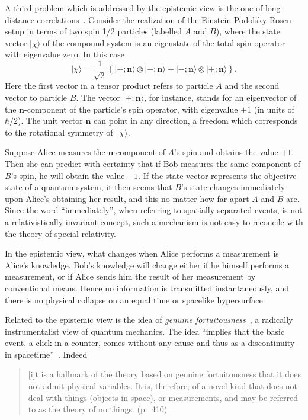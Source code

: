 \documentclass[12pt]{article}
\begin{document}
A third problem which is addressed by the epistemic view
is the one of long-distance correlations~\cite{fuchs2,bloch}.
Consider the realization of the Einstein-Podolsky-Rosen
setup in terms of two spin 1/2 particles (labelled $A$
and $B$), where the state vector $|\chi\rangle$
of the compound system is an eigenstate of the
total spin operator with eigenvalue zero.  In this case
%
\begin{equation}
|\chi\rangle = \frac{1}{\sqrt{2}}
\left\{ |+; \mathbf{n} \rangle \otimes |-; \mathbf{n} \rangle -
|-; \mathbf{n} \rangle \otimes |+; \mathbf{n} \rangle \right\} .
\end{equation}
%
Here the first vector in a tensor product refers to
particle $A$ and the second vector to particle $B$.
The vector $|+; \mathbf{n} \rangle $, for instance,
stands for an eigenvector of the $\mathbf{n}$-component
of the particle's spin operator, with eigenvalue
$+1$ (in units of $\hbar/2$).
The unit vector $\mathbf{n}$ can point in any direction,
a freedom which corresponds to the
rotational symmetry of~$|\chi\rangle$.

Suppose Alice measures the $\mathbf{n}$-component
of $A$'s spin and obtains the value $+1$.  Then
she can predict with certainty that if Bob measures
the same component of $B$'s spin, he will obtain the
value $-1$.  If the state vector represents the
objective state of a quantum system, it then seems that
$B$'s state changes immediately upon Alice's obtaining
her result, and this no matter how far apart $A$ and
$B$ are.  Since the word ``immediately'', when
referring to spatially separated events, is not a
relativistically invariant concept, such a mechanism is
not easy to reconcile with the theory of special relativity.

In the epistemic view, what changes when Alice
performs a measurement is Alice's knowledge.
Bob's knowledge will change either if he himself
performs a measurement, or if Alice sends him
the result of her measurement by conventional
means.  Hence no information is transmitted
instantaneously, and there is no physical collapse
on an equal time or spacelike hypersurface.

Related to the epistemic view is the idea of
\emph{genuine fortuitousness}~\cite{ulfbeck,bohr},
a radically instrumentalist view of quantum
mechanics.  The idea ``implies
that the basic event, a click in a counter, comes
without any cause and thus as a discontinuity in 
spacetime''~\cite[p.~405]{bohr}.  Indeed
%
\begin{quote}
[i]t is a hallmark of the theory based on genuine
fortuitousness that it does not admit physical variables.
It is, therefore, of a novel kind that does not deal
with things (objects in space), or measurements, and
may be referred to as the theory of no things. (p.~410)
\end{quote}
%
\end{document}
